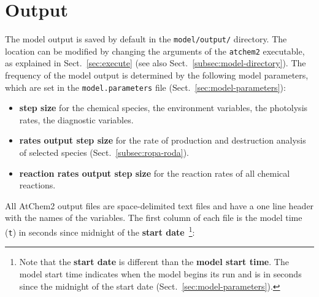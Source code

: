 \section{Output} \label{sec:output}

The model output is saved by default in the \texttt{model/output/}
directory. The location can be modified by changing the arguments of
the \texttt{atchem2} executable, as explained in Sect.~\ref{sec:execute}
(see also Sect.~\ref{subsec:model-directory}). The frequency of the model
output is determined by the following model parameters, which are set
in the \texttt{model.parameters} file (Sect.~\ref{sec:model-parameters}):

\begin{itemize}
\item \textbf{step size} for the chemical species, the environment
  variables, the photolysis rates, the diagnostic variables.
\item \textbf{rates output step size} for the rate of production and
  destruction analysis of selected species (Sect.~\ref{subsec:ropa-roda}).
\item \textbf{reaction rates output step size} for the reaction rates
  of all chemical reactions.
\end{itemize}

All AtChem2 output files are space-delimited text files and have a one
line header with the names of the variables. The first column of each
file is the model time (\texttt{t}) in seconds since midnight of the
\textbf{start date}~\footnote{Note that the \textbf{start date} is
  different than the \textbf{model start time}. The model start time
  indicates when the model begins its run and is in seconds since the
  midnight of the start date (Sect.~\ref{sec:model-parameters}).}:

